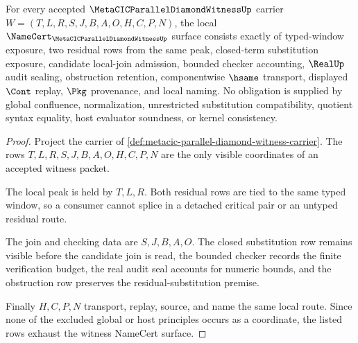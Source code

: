 \begin{theorem}
\label{thm:metacic-parallel-diamond-witness-obligations}
For every accepted $\MetaCICParallelDiamondWitnessUp$ carrier $W=(T,L,R,S,J,B,A,O,H,C,P,N)$, the local $\NameCert_{\MetaCICParallelDiamondWitnessUp}$ surface consists exactly of typed-window exposure, two residual rows from the same peak, closed-term substitution exposure, candidate local-join admission, bounded checker accounting, $\RealUp$ audit sealing, obstruction retention, componentwise $\hsame$ transport, displayed $\Cont$ replay, $\Pkg$ provenance, and local naming. No obligation is supplied by global confluence, normalization, unrestricted substitution compatibility, quotient syntax equality, host evaluator soundness, or kernel consistency.
\end{theorem}
\begin{proof}
Project the carrier of \autoref{def:metacic-parallel-diamond-witness-carrier}. The rows $T,L,R,S,J,B,A,O,H,C,P,N$ are the only visible coordinates of an accepted witness packet.

The local peak is held by $T,L,R$. Both residual rows are tied to the same typed window, so a consumer cannot splice in a detached critical pair or an untyped residual route.

The join and checking data are $S,J,B,A,O$. The closed substitution row remains visible before the candidate join is read, the bounded checker records the finite verification budget, the real audit seal accounts for numeric bounds, and the obstruction row preserves the residual-substitution premise.

Finally $H,C,P,N$ transport, replay, source, and name the same local route. Since none of the excluded global or host principles occurs as a coordinate, the listed rows exhaust the witness NameCert surface.
\end{proof}

